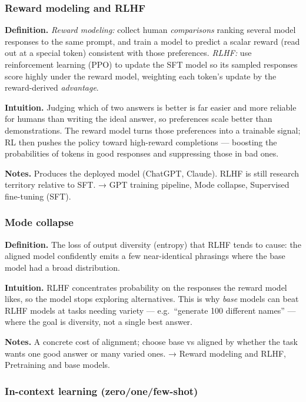 \documentclass[
  10pt,
  letterpaper,
  onecolumn]{article}
\begin{document}
\hypertarget{reward-modeling-and-rlhf}{%
\subsubsection{Reward modeling and
RLHF}\label{reward-modeling-and-rlhf}}

\textbf{Definition.} \emph{Reward modeling:} collect human
\emph{comparisons} ranking several model responses to the same prompt,
and train a model to predict a scalar reward (read out at a special
token) consistent with those preferences. \emph{RLHF:} use reinforcement
learning (PPO) to update the SFT model so its sampled responses score
highly under the reward model, weighting each token's update by the
reward-derived \emph{advantage}.

\textbf{Intuition.} Judging which of two answers is better is far easier
and more reliable for humans than writing the ideal answer, so
preferences scale better than demonstrations. The reward model turns
those preferences into a trainable signal; RL then pushes the policy
toward high-reward completions --- boosting the probabilities of tokens
in good responses and suppressing those in bad ones.

\textbf{Notes.} Produces the deployed model (ChatGPT, Claude). RLHF is
still research territory relative to SFT. → GPT training pipeline, Mode
collapse, Supervised fine-tuning (SFT).

\hypertarget{mode-collapse}{%
\subsubsection{Mode collapse}\label{mode-collapse}}

\textbf{Definition.} The loss of output diversity (entropy) that RLHF
tends to cause: the aligned model confidently emits a few near-identical
phrasings where the base model had a broad distribution.

\textbf{Intuition.} RLHF concentrates probability on the responses the
reward model likes, so the model stops exploring alternatives. This is
why \emph{base} models can beat RLHF models at tasks needing variety ---
e.g.~``generate 100 different names'' --- where the goal is diversity,
not a single best answer.

\textbf{Notes.} A concrete cost of alignment; choose base vs aligned by
whether the task wants one good answer or many varied ones. → Reward
modeling and RLHF, Pretraining and base models.

\hypertarget{in-context-learning-zeroonefew-shot}{%
\subsubsection{In-context learning
(zero/one/few-shot)}\label{in-context-learning-zeroonefew-shot}}
\end{document}
